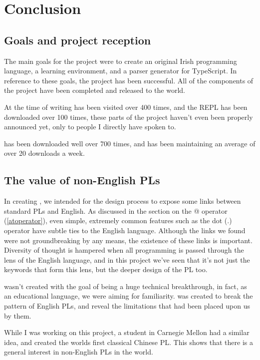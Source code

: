 \chapter{Conclusion}

\section{Goals and project reception}
The main goals for the project were to create an original Irish programming language, a learning environment, and a parser generator for TypeScript. In reference to these goals, the project has been successful. All of the components of the project have been completed and released to the world.

At the time of writing \trys{} has been visited over 400 times, and the \Setanta{} REPL has been downloaded over 100 times, these parts of the project haven't even been properly announced yet, only to people I directly have spoken to.

\tsPEG{} has been downloaded well over 700 times, and has been maintaining an average of over 20 downloads a week.

\section{The value of non-English PLs}

In creating \Setanta{}, we intended for the design process to expose some links between standard PLs and English. As discussed in the section on the @ operator (\ref{atoperator}), even simple, extremely common features such as the dot (.) operator have subtle ties to the English language. Although the links we found were not groundbreaking by any means, the existence of these links is important. Diversity of thought is hampered when all programming is passed through the lens of the English language, and in this project we've seen that it's not just the keywords that form this lens, but the deeper design of the PL too.

\Setanta{} wasn't created with the goal of being a huge technical breakthrough, in fact, as an educational language, we were aiming for familiarity.
\Setanta{} was created to break the pattern of English PLs, and reveal the limitations that had been placed upon us by them.

While I was working on this project, a student in Carnegie Mellon had a similar idea, and created the worlds first classical Chinese PL\cite{chinesepl}. This shows that there is a general interest in non-English PLs in the world.

